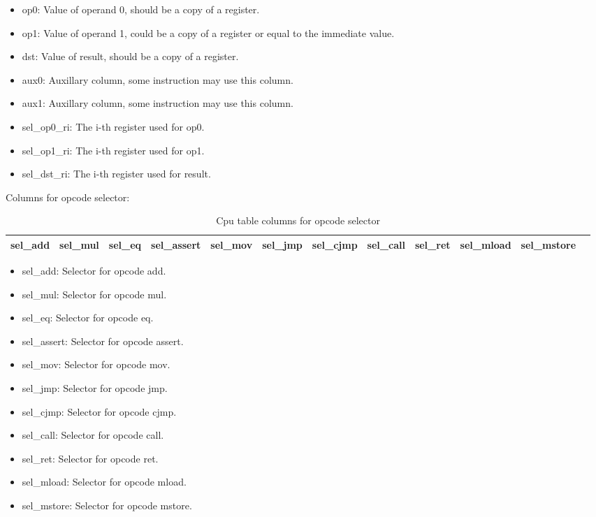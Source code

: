 \begin{itemize}
    \item op0: Value of operand 0, should be a copy of a register.
    \item op1: Value of operand 1, could be a copy of a register or equal to the immediate value.
    \item dst: Value of result, should be a copy of a register.
    \item aux0: Auxillary column, some instruction may use this column.
    \item aux1: Auxillary column, some instruction may use this column.
    \item sel\_op0\_ri: The i-th register used for op0.
    \item sel\_op1\_ri: The i-th register used for op1.
    \item sel\_dst\_ri: The i-th register used for result.
\end{itemize}

Columns for opcode selector:
\begin{table}[!ht]
    \centering
    \begin{tabular}{|c|c|c|c|c|c|c|c|c|c|c|c|}
        \hline
        sel\_add & sel\_mul & sel\_eq & sel\_assert & sel\_mov & sel\_jmp & sel\_cjmp & sel\_call & sel\_ret & sel\_mload & sel\_mstore \\
        \hline
    \end{tabular}
    \caption{Cpu table columns for opcode selector}
    \label{table:cpu-columns-opcode-selector}
\end{table}

\begin{itemize}
    \item sel\_add: Selector for opcode add.
    \item sel\_mul: Selector for opcode mul.
    \item sel\_eq: Selector for opcode eq.
    \item sel\_assert: Selector for opcode assert.
    \item sel\_mov: Selector for opcode mov.
    \item sel\_jmp: Selector for opcode jmp.
    \item sel\_cjmp: Selector for opcode cjmp.
    \item sel\_call: Selector for opcode call.
    \item sel\_ret: Selector for opcode ret.
    \item sel\_mload: Selector for opcode mload.
    \item sel\_mstore: Selector for opcode mstore.
\end{itemize}

